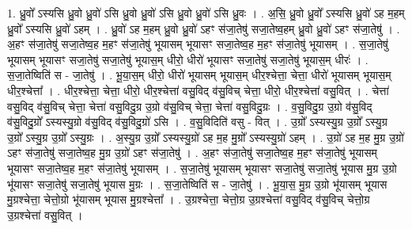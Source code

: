 \documentclass[17pt]{extarticle}
\begin{document}
1. ध्रु॒वो᳚ ऽस्यसि ध्रु॒वो ध्रु॒वो॑ ऽसि ध्रु॒वो ध्रु॒वो॑ ऽसि ध्रु॒वो ध्रु॒वो॑ ऽसि ध्रु॒वः । . अ॒सि॒ ध्रु॒वो ध्रु॒वो᳚ ऽस्यसि ध्रु॒वो॑ ऽह म॒हम् ध्रु॒वो᳚ ऽस्यसि ध्रु॒वो॑ ऽहम् । . ध्रु॒वो॑ ऽह म॒हम् ध्रु॒वो ध्रु॒वो॑ ऽहꣳ स॑जा॒तेषु॑ सजा॒तेष्व॒हम् ध्रु॒वो ध्रु॒वो॑ ऽहꣳ स॑जा॒तेषु॑ । . अ॒हꣳ स॑जा॒तेषु॑ सजा॒तेष्व॒ह म॒हꣳ स॑जा॒तेषु॑ भूयासम् भूयासꣳ सजा॒तेष्व॒ह म॒हꣳ स॑जा॒तेषु॑ भूयासम् । . स॒जा॒तेषु॑ भूयासम् भूयासꣳ सजा॒तेषु॑ सजा॒तेषु॑ भूयास॒म् धीरो॒ धीरो॑ भूयासꣳ सजा॒तेषु॑ सजा॒तेषु॑ भूयास॒म् धीरः॑ । . स॒जा॒तेष्विति॑ स - जा॒तेषु॑ । . भू॒या॒स॒म् धीरो॒ धीरो॑ भूयासम् भूयास॒म् धीर॒श्चेत्ता॒ चेत्ता॒ धीरो॑ भूयासम् भूयास॒म् धीर॒श्चेत्ता᳚ । . धीर॒श्चेत्ता॒ चेत्ता॒ धीरो॒ धीर॒श्चेत्ता॑ वसु॒विद् व॑सु॒विच् चेत्ता॒ धीरो॒ धीर॒श्चेत्ता॑ वसु॒वित् । . चेत्ता॑ वसु॒विद् व॑सु॒विच् चेत्ता॒ चेत्ता॑ वसु॒विदु॒ग्र उ॒ग्रो व॑सु॒विच् चेत्ता॒ चेत्ता॑ वसु॒विदु॒ग्रः । . व॒सु॒विदु॒ग्र उ॒ग्रो व॑सु॒विद् व॑सु॒विदु॒ग्रो᳚ ऽस्यस्यु॒ग्रो व॑सु॒विद् व॑सु॒विदु॒ग्रो॑ ऽसि । . व॒सु॒विदिति॑ वसु - वित् । . उ॒ग्रो᳚ ऽस्यस्यु॒ग्र उ॒ग्रो᳚ ऽस्यु॒ग्र उ॒ग्रो᳚ ऽस्यु॒ग्र उ॒ग्रो᳚ ऽस्यु॒ग्रः । . अ॒स्यु॒ग्र उ॒ग्रो᳚ ऽस्यस्यु॒ग्रो॑ ऽह म॒ह मु॒ग्रो᳚ ऽस्यस्यु॒ग्रो॑ ऽहम् । . उ॒ग्रो॑ ऽह म॒ह मु॒ग्र उ॒ग्रो॑ ऽहꣳ स॑जा॒तेषु॑ सजा॒तेष्व॒ह मु॒ग्र उ॒ग्रो॑ ऽहꣳ स॑जा॒तेषु॑ । . अ॒हꣳ स॑जा॒तेषु॑ सजा॒तेष्व॒ह म॒हꣳ स॑जा॒तेषु॑ भूयासम् भूयासꣳ सजा॒तेष्व॒ह म॒हꣳ स॑जा॒तेषु॑ भूयासम् । . स॒जा॒तेषु॑ भूयासम् भूयासꣳ सजा॒तेषु॑ सजा॒तेषु॑ भूयास मु॒ग्र उ॒ग्रो भू॑यासꣳ सजा॒तेषु॑ सजा॒तेषु॑ भूयास मु॒ग्रः । . स॒जा॒तेष्विति॑ स - जा॒तेषु॑ । . भू॒या॒स॒ मु॒ग्र उ॒ग्रो भू॑यासम् भूयास मु॒ग्रश्चेत्ता॒ चेत्तो॒ग्रो भू॑यासम् भूयास मु॒ग्रश्चेत्ता᳚ । . उ॒ग्रश्चेत्ता॒ चेत्तो॒ग्र उ॒ग्रश्चेत्ता॑ वसु॒विद् व॑सु॒विच् चेत्तो॒ग्र उ॒ग्रश्चेत्ता॑ वसु॒वित् । \newline
\end{document}
